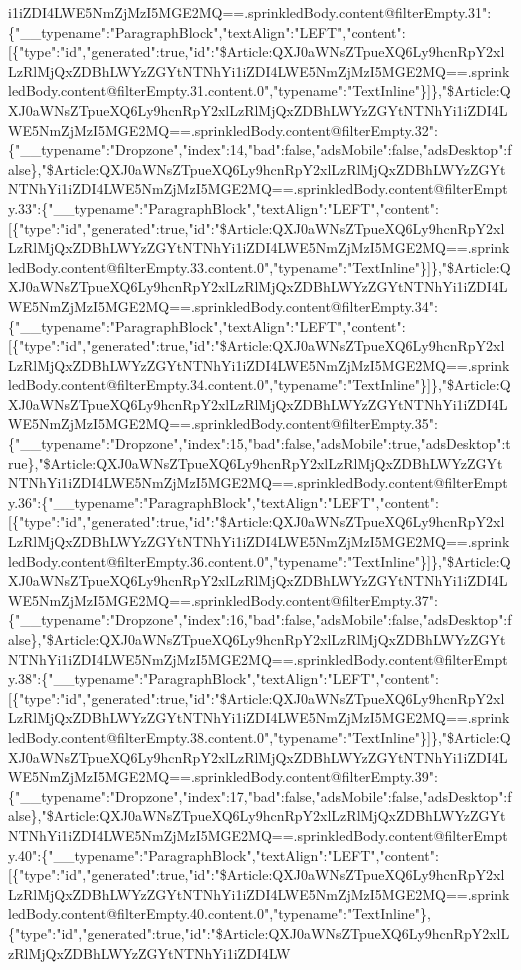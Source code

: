 i1iZDI4LWE5NmZjMzI5MGE2MQ==.sprinkledBody.content@filterEmpty.31":\{"\_\_typename":"ParagraphBlock","textAlign":"LEFT","content":{[}\{"type":"id","generated":true,"id":"\$Article:QXJ0aWNsZTpueXQ6Ly9hcnRpY2xlLzRlMjQxZDBhLWYzZGYtNTNhYi1iZDI4LWE5NmZjMzI5MGE2MQ==.sprinkledBody.content@filterEmpty.31.content.0","typename":"TextInline"\}{]}\},"\$Article:QXJ0aWNsZTpueXQ6Ly9hcnRpY2xlLzRlMjQxZDBhLWYzZGYtNTNhYi1iZDI4LWE5NmZjMzI5MGE2MQ==.sprinkledBody.content@filterEmpty.32":\{"\_\_typename":"Dropzone","index":14,"bad":false,"adsMobile":false,"adsDesktop":false\},"\$Article:QXJ0aWNsZTpueXQ6Ly9hcnRpY2xlLzRlMjQxZDBhLWYzZGYtNTNhYi1iZDI4LWE5NmZjMzI5MGE2MQ==.sprinkledBody.content@filterEmpty.33":\{"\_\_typename":"ParagraphBlock","textAlign":"LEFT","content":{[}\{"type":"id","generated":true,"id":"\$Article:QXJ0aWNsZTpueXQ6Ly9hcnRpY2xlLzRlMjQxZDBhLWYzZGYtNTNhYi1iZDI4LWE5NmZjMzI5MGE2MQ==.sprinkledBody.content@filterEmpty.33.content.0","typename":"TextInline"\}{]}\},"\$Article:QXJ0aWNsZTpueXQ6Ly9hcnRpY2xlLzRlMjQxZDBhLWYzZGYtNTNhYi1iZDI4LWE5NmZjMzI5MGE2MQ==.sprinkledBody.content@filterEmpty.34":\{"\_\_typename":"ParagraphBlock","textAlign":"LEFT","content":{[}\{"type":"id","generated":true,"id":"\$Article:QXJ0aWNsZTpueXQ6Ly9hcnRpY2xlLzRlMjQxZDBhLWYzZGYtNTNhYi1iZDI4LWE5NmZjMzI5MGE2MQ==.sprinkledBody.content@filterEmpty.34.content.0","typename":"TextInline"\}{]}\},"\$Article:QXJ0aWNsZTpueXQ6Ly9hcnRpY2xlLzRlMjQxZDBhLWYzZGYtNTNhYi1iZDI4LWE5NmZjMzI5MGE2MQ==.sprinkledBody.content@filterEmpty.35":\{"\_\_typename":"Dropzone","index":15,"bad":false,"adsMobile":true,"adsDesktop":true\},"\$Article:QXJ0aWNsZTpueXQ6Ly9hcnRpY2xlLzRlMjQxZDBhLWYzZGYtNTNhYi1iZDI4LWE5NmZjMzI5MGE2MQ==.sprinkledBody.content@filterEmpty.36":\{"\_\_typename":"ParagraphBlock","textAlign":"LEFT","content":{[}\{"type":"id","generated":true,"id":"\$Article:QXJ0aWNsZTpueXQ6Ly9hcnRpY2xlLzRlMjQxZDBhLWYzZGYtNTNhYi1iZDI4LWE5NmZjMzI5MGE2MQ==.sprinkledBody.content@filterEmpty.36.content.0","typename":"TextInline"\}{]}\},"\$Article:QXJ0aWNsZTpueXQ6Ly9hcnRpY2xlLzRlMjQxZDBhLWYzZGYtNTNhYi1iZDI4LWE5NmZjMzI5MGE2MQ==.sprinkledBody.content@filterEmpty.37":\{"\_\_typename":"Dropzone","index":16,"bad":false,"adsMobile":false,"adsDesktop":false\},"\$Article:QXJ0aWNsZTpueXQ6Ly9hcnRpY2xlLzRlMjQxZDBhLWYzZGYtNTNhYi1iZDI4LWE5NmZjMzI5MGE2MQ==.sprinkledBody.content@filterEmpty.38":\{"\_\_typename":"ParagraphBlock","textAlign":"LEFT","content":{[}\{"type":"id","generated":true,"id":"\$Article:QXJ0aWNsZTpueXQ6Ly9hcnRpY2xlLzRlMjQxZDBhLWYzZGYtNTNhYi1iZDI4LWE5NmZjMzI5MGE2MQ==.sprinkledBody.content@filterEmpty.38.content.0","typename":"TextInline"\}{]}\},"\$Article:QXJ0aWNsZTpueXQ6Ly9hcnRpY2xlLzRlMjQxZDBhLWYzZGYtNTNhYi1iZDI4LWE5NmZjMzI5MGE2MQ==.sprinkledBody.content@filterEmpty.39":\{"\_\_typename":"Dropzone","index":17,"bad":false,"adsMobile":false,"adsDesktop":false\},"\$Article:QXJ0aWNsZTpueXQ6Ly9hcnRpY2xlLzRlMjQxZDBhLWYzZGYtNTNhYi1iZDI4LWE5NmZjMzI5MGE2MQ==.sprinkledBody.content@filterEmpty.40":\{"\_\_typename":"ParagraphBlock","textAlign":"LEFT","content":{[}\{"type":"id","generated":true,"id":"\$Article:QXJ0aWNsZTpueXQ6Ly9hcnRpY2xlLzRlMjQxZDBhLWYzZGYtNTNhYi1iZDI4LWE5NmZjMzI5MGE2MQ==.sprinkledBody.content@filterEmpty.40.content.0","typename":"TextInline"\},\{"type":"id","generated":true,"id":"\$Article:QXJ0aWNsZTpueXQ6Ly9hcnRpY2xlLzRlMjQxZDBhLWYzZGYtNTNhYi1iZDI4LW